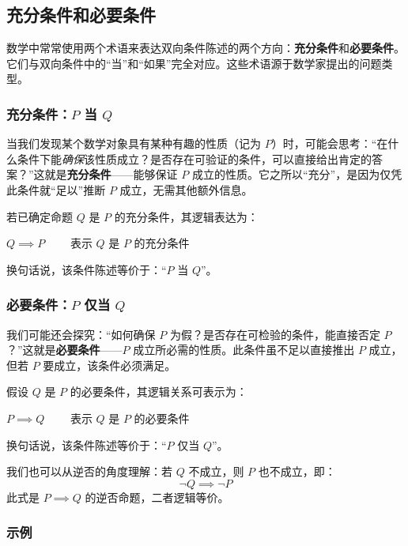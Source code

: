 \subsection{充分条件和必要条件}

数学中常常使用两个术语来表达双向条件陈述的两个方向：\textbf{充分条件}和\textbf{必要条件}。它们与双向条件中的``当''和``如果''完全对应。这些术语源于数学家提出的问题类型。

\subsubsection*{充分条件：$P$ 当 $Q$}

当我们发现某个数学对象具有某种有趣的性质（记为 $P$）时，可能会思考：``在什么条件下能\emph{确保}该性质成立？是否存在可验证的条件，可以直接给出肯定的答案？''这就是\textbf{充分条件}——能够保证 $P$ 成立的性质。它之所以``充分''，是因为仅凭此条件就``足以''推断 $P$ 成立，无需其他额外信息。

若已确定命题 $Q$ 是 $P$ 的充分条件，其逻辑表达为：
\begin{center}
    $Q \implies P \qquad$ 表示 $Q$ 是 $P$ 的充分条件
\end{center}
换句话说，该条件陈述等价于：``$P$ 当 $Q$''。

\subsubsection*{必要条件：$P$ 仅当 $Q$}

我们可能还会探究：``如何确保 $P$ 为假？是否存在可检验的条件，能直接否定 $P$？''这就是\textbf{必要条件}——$P$ 成立所必需的性质。此条件虽不足以直接推出 $P$ 成立，但若 $P$ 要成立，该条件必须满足。

假设 $Q$ 是 $P$ 的必要条件，其逻辑关系可表示为：
\begin{center}
    $P \implies Q \qquad$ 表示 $Q$ 是 $P$ 的必要条件
\end{center}
换句话说，该条件陈述等价于：``$P$ 仅当 $Q$''。

我们也可以从逆否的角度理解：若 $Q$ 不成立，则 $P$ 也不成立，即：
\[\neg Q \implies \neg P\]
此式是 $P \implies Q$ 的逆否命题，二者逻辑等价。

\subsubsection*{示例}

